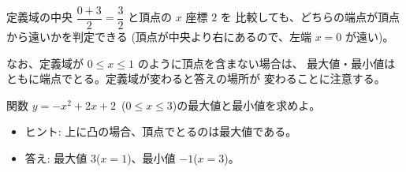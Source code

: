 \documentclass[guided-example]{manabi}
\begin{document}
\begin{mnbnote}
定義域の中央 $\dfrac{0 + 3}{2} = \dfrac{3}{2}$ と頂点の $x$ 座標 $2$ を
比較しても、どちらの端点が頂点から遠いかを判定できる
(頂点が中央より右にあるので、左端 $x = 0$ が遠い)。

なお、定義域が $0 \le x \le 1$ のように頂点を含まない場合は、
最大値・最小値はともに端点でとる。定義域が変わると答えの場所が
変わることに注意する。
\end{mnbnote}

\begin{mnbpractice}
関数 $y = -x^2 + 2x + 2$~($0 \le x \le 3$)の最大値と最小値を求めよ。

\vspace{2pt}
\begin{itemize}[leftmargin=1.6em]\small
  \item ヒント: 上に凸の場合、頂点でとるのは最大値である。
  \item 答え: 最大値 $3$($x = 1$)、最小値 $-1$($x = 3$)。
\end{itemize}
\end{mnbpractice}
\end{document}
